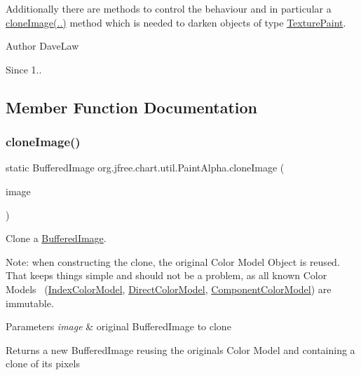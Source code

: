 Additionally there are methods to control the behaviour and in particular a \mbox{\hyperlink{classorg_1_1jfree_1_1chart_1_1util_1_1_paint_alpha_a38ba8e2c54dd62310181f208019add8a}{clone\+Image(..)}} method which is needed to darken objects of type \mbox{\hyperlink{}{Texture\+Paint}}.

\begin{DoxyAuthor}{Author}
Dave\+Law
\end{DoxyAuthor}
\begin{DoxySince}{Since}
1.. 
\end{DoxySince}


\subsection{Member Function Documentation}
\mbox{\label{classorg_1_1jfree_1_1chart_1_1util_1_1_paint_alpha_a38ba8e2c54dd62310181f208019add8a}} 
\subsubsection{\texorpdfstring{clone\+Image()}{cloneImage()}}
{\footnotesize\ttfamily static Buffered\+Image org.\+jfree.\+chart.\+util.\+Paint\+Alpha.\+clone\+Image (\begin{DoxyParamCaption}\item[{Buffered\+Image}]{image }\end{DoxyParamCaption})\hspace{0.3cm}{\ttfamily [static]}}

Clone a \mbox{\hyperlink{}{Buffered\+Image}}. 

Note\+: when constructing the clone, the original Color Model Object is reused.~\newline
 That keeps things simple and should not be a problem, as all known Color Models~\newline
 (\mbox{\hyperlink{}{Index\+Color\+Model}}, \mbox{\hyperlink{}{Direct\+Color\+Model}}, \mbox{\hyperlink{}{Component\+Color\+Model}}) are immutable.


\begin{DoxyParams}{Parameters}
{\em image} & original Buffered\+Image to clone\\
\hline
\end{DoxyParams}
\begin{DoxyReturn}{Returns}
a new Buffered\+Image reusing the original\textquotesingle{}s Color Model and containing a clone of its pixels 
\end{DoxyReturn}
\mbox{\label{classorg_1_1jfree_1_1chart_1_1util_1_1_paint_alpha_af68c300f097acdce3b6230a5fe4cacad}} 
